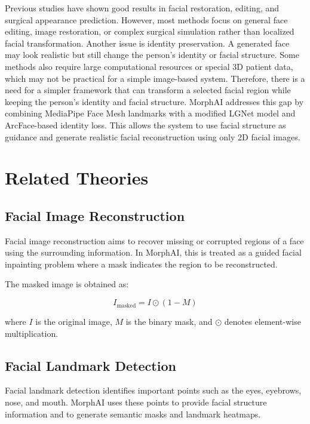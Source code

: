 Previous studies have shown good results in facial restoration, editing, and surgical appearance prediction. However, most methods focus on general face editing, image restoration, or complex surgical simulation rather than localized facial transformation.
\newline
Another issue is identity preservation. A generated face may look realistic but still change the person's identity or facial structure. Some methods also require large computational resources or special 3D patient data, which may not be practical for a simple image-based system.
\newline
Therefore, there is a need for a simpler framework that can transform a selected facial region while keeping the person's identity and facial structure. MorphAI addresses this gap by combining MediaPipe Face Mesh landmarks with a modified LGNet model and ArcFace-based identity loss. This allows the system to use facial structure as guidance and generate realistic facial reconstruction using only 2D facial images.


\section{Related Theories}
\subsection{Facial Image Reconstruction}

Facial image reconstruction aims to recover missing or corrupted regions of a face using the surrounding information. In MorphAI, this is treated as a guided facial inpainting problem where a mask indicates the region to be reconstructed.

\noindent The masked image is obtained as:

\begin{equation}
I_{\text{masked}} = I \odot (1-M)
\end{equation}

\noindent where $I$ is the original image, $M$ is the binary mask, and $\odot$ denotes element-wise multiplication.

\subsection{Facial Landmark Detection}

Facial landmark detection identifies important points such as the eyes, eyebrows, nose, and mouth. MorphAI uses these points to provide facial structure information and to generate semantic masks and landmark heatmaps.

